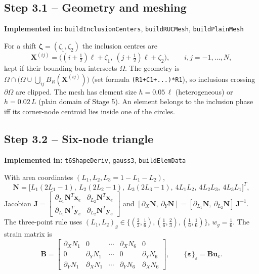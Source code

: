 \documentclass[11pt,a4paper]{article}
\newcommand{\eps}{\bm{\varepsilon}}
\newcommand{\bX}{\bm{X}}
\newcommand{\bu}{\bm{u}}
\newcommand{\ve}[1]{\{#1\}_{\varepsilon}}      %
\newcommand{\code}[1]{\texttt{#1}}
\theoremstyle{plain}
\theoremstyle{remark}
\newcommand{\implementedin}[1]{\begin{codebox}\textbf{Implemented in:} #1\end{codebox}}
\begin{document}
\subsection*{Step 3.1 -- Geometry and meshing}
\implementedin{\code{buildInclusionCenters}, \code{buildRUCMesh}, \code{buildPlainMesh}}
For a shift $\bm\zeta=(\zeta_1,\zeta_2)$ the inclusion centres are
\begin{equation}
  \bX^{(ij)}=\big((i+\tfrac12)\ell+\zeta_1,\ (j+\tfrac12)\ell+\zeta_2\big),\qquad i,j=-1,\dots,N,
  \label{eq:centres}
\end{equation}
kept if their bounding box intersects $\Omega$. The geometry is
$\Omega\cap\big(\Omega\cup\bigcup_{ij}B_R(\bX^{(ij)})\big)$ (set formula \code{(R1+C1+...)*R1}),
so inclusions crossing $\partial\Omega$ are clipped. The mesh has element size $h=0.05\,\ell$
(heterogeneous) or $h=0.02\,L$ (plain domain of Stage 5). An element belongs to the inclusion
phase iff its corner-node centroid lies inside one of the circles.

\subsection*{Step 3.2 -- Six-node triangle}
\implementedin{\code{t6ShapeDeriv}, \code{gauss3}, \code{buildElemData}}
With area coordinates $(L_1,L_2,L_3=1-L_1-L_2)$,
\begin{equation}
  \bm N=\big[L_1(2L_1-1),\ L_2(2L_2-1),\ L_3(2L_3-1),\ 4L_1L_2,\ 4L_2L_3,\ 4L_3L_1\big]^T,
  \label{eq:shape}
\end{equation}
Jacobian $\bm J=\begin{bmatrix}\partial_{L_1}\bm N^T\bm x_e&\partial_{L_2}\bm N^T\bm x_e\\
\partial_{L_1}\bm N^T\bm y_e&\partial_{L_2}\bm N^T\bm y_e\end{bmatrix}$ and
$[\partial_X\bm N,\ \partial_Y\bm N]=[\partial_{L_1}\bm N,\ \partial_{L_2}\bm N]\,\bm J^{-1}$.
The three-point rule uses $(L_1,L_2)_g\in\{(\tfrac23,\tfrac16),(\tfrac16,\tfrac23),(\tfrac16,\tfrac16)\}$,
$w_g=\tfrac16$. The strain matrix is
\begin{equation}
  \bm B=\begin{bmatrix}
  \partial_XN_1&0&\cdots&\partial_XN_6&0\\
  0&\partial_YN_1&\cdots&0&\partial_YN_6\\
  \partial_YN_1&\partial_XN_1&\cdots&\partial_YN_6&\partial_XN_6\end{bmatrix},\qquad
  \ve{\eps}=\bm B\bu_e .
  \label{eq:B}
\end{equation}
\end{document}
